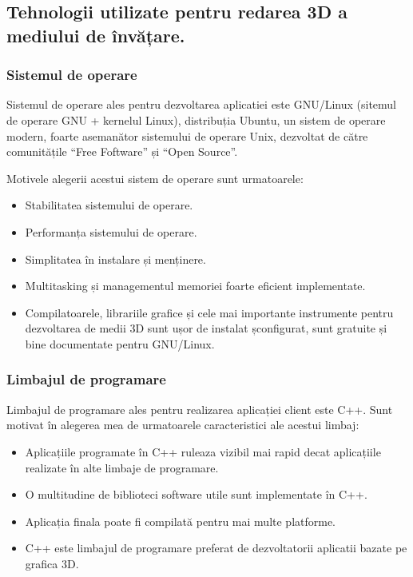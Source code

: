 \subsection{Tehnologii utilizate pentru redarea 3D a mediului de învățare.}
\subsubsection{Sistemul de operare}
\par Sistemul de operare ales pentru dezvoltarea aplicatiei este GNU/Linux (sitemul de operare GNU + kernelul Linux), distribuția Ubuntu, un sistem de operare modern, foarte asemanător sistemului de operare Unix, dezvoltat de către comunitățile “Free Foftware” și “Open Source”.
\par Motivele alegerii acestui sistem de operare sunt urmatoarele: 
\begin{itemize}
\item Stabilitatea sistemului de operare. 
\item Performanța sistemului de operare. 
\item Simplitatea în instalare și menținere.  
\item Multitasking și managementul memoriei foarte eficient implementate.
\item Compilatoarele, librariile grafice și cele mai importante instrumente pentru dezvoltarea de medii 3D sunt ușor de instalat șconfigurat, sunt gratuite și bine documentate pentru GNU/Linux.
\end{itemize}

\subsubsection{Limbajul de programare}

\par Limbajul de programare ales pentru realizarea aplicației client este C++. Sunt motivat în alegerea mea de urmatoarele caracteristici ale acestui limbaj:  
\begin{itemize}
\item Aplicațiile programate în C++ ruleaza vizibil mai rapid decat aplicațiile realizate în alte limbaje de programare.
\item O multitudine de biblioteci software utile sunt implementate în C++.
\item Aplicația finala poate fi compilată pentru mai multe platforme.
\item C++ este limbajul de programare preferat de dezvoltatorii aplicatii bazate pe grafica 3D.
\end{itemize}
     
